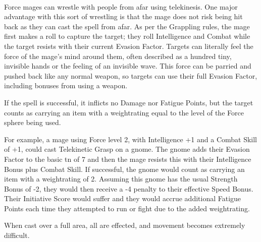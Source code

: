 \begin{multicols}{2}
\spelllevel

\\
Force mages can wrestle with people from afar using telekinesis. One major advantage with this sort of wrestling is that the mage does not risk being hit back as they can cast the spell from afar. As per the Grappling rules, the mage first makes a roll to capture the target; they roll Intelligence and Combat while the target resists with their current Evasion Factor. Targets can literally feel the force of the mage's mind around them, often described as a hundred tiny, invisible hands or the feeling of an invisible wave. This force can be parried and pushed back like any normal weapon, so targets can use their full Evasion Factor, including bonuses from using a weapon.

If the spell is successful, it inflicts no Damage nor Fatigue Points, but the target counts as carrying an item with a \gls{weightrating} equal to the level of the Force sphere being used.

For example, a mage using Force level 2, with Intelligence +1 and a Combat Skill of +1, could cast Telekinetic Grasp on a gnome.
The gnome adds their Evasion Factor to the basic \gls{tn} of 7 and then the mage resists this with their Intelligence Bonus plus Combat Skill.
If successful, the gnome would count as carrying an item with a \gls{weightrating} of 2.
Assuming this gnome has the usual Strength Bonus of -2, they would then receive a -4 penalty to their effective Speed Bonus.
Their Initiative Score would suffer and they would accrue additional Fatigue Points each time they attempted to run or fight due to the added \gls{weightrating}.

When cast over a full area, all are effected, and movement becomes extremely difficult.



\end{multicols}


